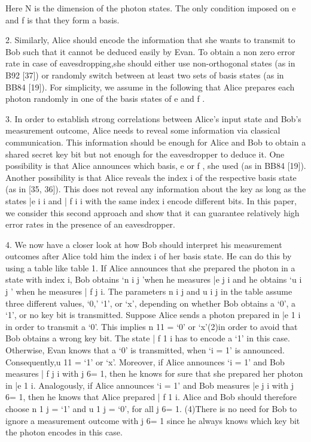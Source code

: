 Here N is the dimension of the photon states. The only condition imposed on e and f is that they form a basis.

2. Similarly, Alice should encode the information that she wants to transmit to Bob such that it cannot be deduced easily by Evan. To obtain a non zero error rate in case of eavesdropping,she should either use non-orthogonal states (as in B92 [37]) or randomly switch between at least two sets of basis states (as in BB84 [19]). For simplicity, we assume in the following that Alice prepares each photon randomly in one of the basis states of e and f .

3. In order to establish strong correlations between Alice’s input state and Bob’s measurement outcome, Alice needs to reveal some information via classical communication. This information should be enough for Alice and Bob to obtain a shared secret key bit but not enough for the eavesdropper to deduce it. One possibility is that Alice announces which basis, e or f , she used (as in BB84 [19]). Another possibility is that Alice reveals the index i of the respective basis state (as in [35, 36]). This does not reveal any information about the key as long as the states |e i i and | f i i with the same index i encode different bits. In this paper, we consider this second approach and show that it can guarantee relatively high error rates in the presence of an eavesdropper.

4. We now have a closer look at how Bob should interpret his measurement outcomes after Alice told him the index i of her basis state. He can do this by using a table like table 1. If Alice announces that she prepared the photon in a state with index i, Bob obtains ‘n i j ’when he measures |e j i and he obtains ‘u i j ’ when he measures | f j i. The parameters n i j and u i j in the table assume three different values, ‘0,’ ‘1’, or ‘x’, depending on whether Bob obtains a ‘0’, a ‘1’, or no key bit is transmitted.
Suppose Alice sends a photon prepared in |e 1 i in order to transmit a ‘0’. This implies n 11 = ‘0’ or ‘x’(2)in order to avoid that Bob obtains a wrong key bit. The state | f 1 i has to encode a ‘1’ in this case. Otherwise, Evan knows that a ‘0’ is transmitted, when ‘i = 1’ is announced.
Consequently,u 11 = ‘1’ or ‘x’. Moreover, if Alice announces ‘i = 1’ and Bob measures | f j i with j 6= 1, then he knows for sure that she prepared her photon in |e 1 i. Analogously, if Alice announces ‘i = 1’ and Bob measures |e j i with j 6= 1, then he knows that Alice prepared | f 1 i. Alice and Bob should therefore choose n 1 j = ‘1’ and u 1 j = ‘0’, for all j 6= 1.
(4)There is no need for Bob to ignore a measurement outcome with j 6= 1 since he always knows which key bit the photon encodes in this case.

